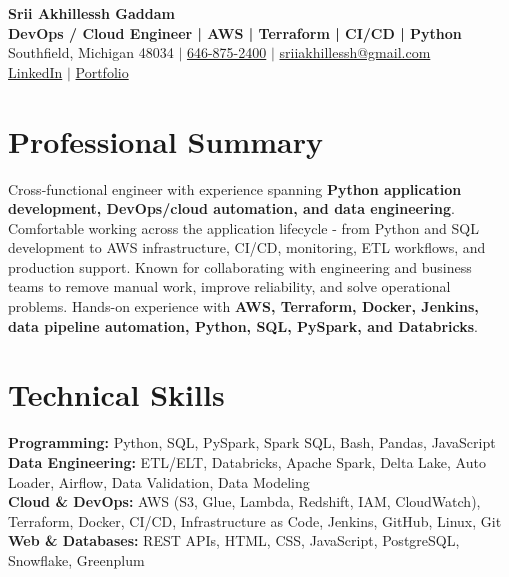 \documentclass[letterpaper,10pt]{article}
\begin{document}
\fontsize{9.35pt}{10.45pt}\selectfont

\begin{center}
    {\LARGE \textbf{Srii Akhillessh Gaddam}} \\[-1pt]
    \textbf{DevOps / Cloud Engineer | AWS | Terraform | CI/CD | Python} \\[2pt]
    Southfield, Michigan 48034 $|$
    \href{tel:6468752400}{646-875-2400} $|$
    \href{mailto:sriiakhillessh@gmail.com}{sriiakhillessh@gmail.com} \\[1pt]
    \href{https://www.linkedin.com/in/srii-akhiilessh-gaddam-b48668191/}{LinkedIn} $|$
    \href{https://sriiakhillesshg.github.io/portfolio/}{Portfolio}
\end{center}
\vspace{-8pt}

\section{Professional Summary}
\small{Cross-functional engineer with experience spanning \textbf{Python application development, DevOps/cloud automation, and data engineering}. Comfortable working across the application lifecycle - from Python and SQL development to AWS infrastructure, CI/CD, monitoring, ETL workflows, and production support. Known for collaborating with engineering and business teams to remove manual work, improve reliability, and solve operational problems. Hands-on experience with \textbf{AWS, Terraform, Docker, Jenkins, data pipeline automation, Python, SQL, PySpark, and Databricks}.}

\section{Technical Skills}
\small{
\textbf{Programming:} Python, SQL, PySpark, Spark SQL, Bash, Pandas, JavaScript \\
\textbf{Data Engineering:} ETL/ELT, Databricks, Apache Spark, Delta Lake, Auto Loader, Airflow, Data Validation, Data Modeling \\
\textbf{Cloud \& DevOps:} AWS (S3, Glue, Lambda, Redshift, IAM, CloudWatch), Terraform, Docker, CI/CD, Infrastructure as Code, Jenkins, GitHub, Linux, Git \\
\textbf{Web \& Databases:} REST APIs, HTML, CSS, JavaScript, PostgreSQL, Snowflake, Greenplum
}
\end{document}
